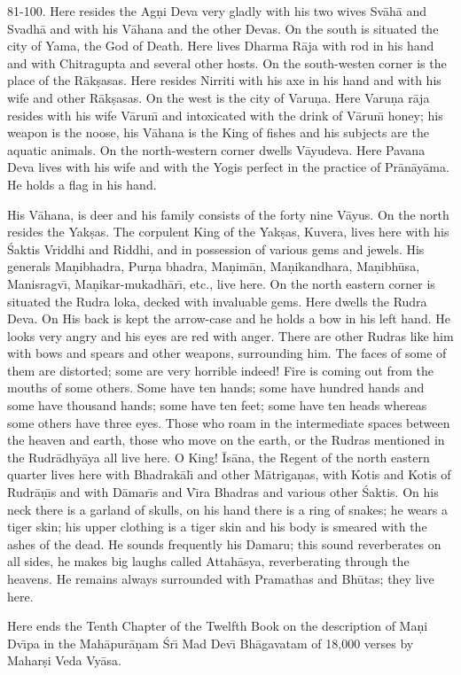 81-100. Here resides the Ag\d{n}i Deva very gladly with his two wives Sv\=ah\=a and Svadh\=a and with his V\=ahana and the other Devas. On the south is situated the city of Yama, the God of Death. Here lives Dharma R\=aja with rod in his hand and with Chitragupta and several other hosts. On the south-westen corner is the place of the R\=ak\d{s}asas. Here resides Nirriti with his axe in his hand and with his wife and other R\=ak\d{s}asas. On the west is the city of Varu\d{n}a. Here Varu\d{n}a r\=aja resides with his wife V\=arun\={\i} and intoxicated with the drink of V\=arun\={\i} honey; his weapon is the noose, his V\=ahana is the King of fishes and his subjects are the aquatic animals. On the north-western corner dwells V\=ayudeva. Here Pavana Deva lives with his wife and with the Yogis perfect in the practice of Pr\=an\=ay\=ama. He holds a flag in his hand.

His V\=ahana, is deer and his family consists of the forty nine V\=ayus. On the north resides the Yak\d{s}as. The corpulent King of the Yak\d{s}as, Kuvera, lives here with his \'Saktis Vriddhi and Riddhi, and in possession of various gems and jewels. His generals Ma\d{n}ibhadra, Pur\d{n}a bhadra, Ma\d{n}im\=an, Ma\d{n}ikandhara, Ma\d{n}ibh\=usa, Manisragv\={\i}, Ma\d{n}ikar-mukadh\=ar\={\i}, etc., live here. On the north eastern corner is situated the Rudra loka, decked with invaluable gems. Here dwells the Rudra Deva. On His back is kept the arrow-case and he holds a bow in his left hand. He looks very angry and his eyes are red with anger. There are other Rudras like him with bows and spears and other weapons, surrounding him. The faces of some of them are distorted; some are very horrible indeed! Fire is coming out from the mouths of some others. Some have ten hands; some have hundred hands and some have thousand hands; some have ten feet; some have ten heads whereas some others have three eyes. Those who roam in the intermediate spaces between the heaven and earth, those who move on the earth, or the Rudras mentioned in the Rudr\=adhy\=aya all live here. O King! \=Is\=ana, the Regent of the north eastern quarter lives here with Bhadrak\=al\={\i} and other M\=atriga\d{n}as, with Kotis and Kotis of Rudr\=a\d{n}\={\i}s and with D\=amar\={\i}s and V\={\i}ra Bhadras and various other \'Saktis. On his neck there is a garland of skulls, on his hand there is a ring of snakes; he wears a tiger skin; his upper clothing is a tiger skin and his body is smeared with the ashes of the dead. He sounds frequently his Damaru; this sound reverberates on all sides, he makes big laughs called Attah\=asya, reverberating through the heavens. He remains always surrounded with Pramathas and Bh\=utas; they live here.

Here ends the Tenth Chapter of the Twelfth Book on the description of Ma\d{n}i Dv\={\i}pa in the Mah\=apur\=a\d{n}am \'Sr\={\i} Mad Dev\={\i} Bh\=agavatam of 18,000 verses by Mahar\d{s}i Veda Vy\=asa.



